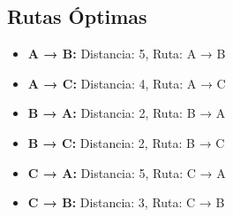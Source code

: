 \documentclass[12pt]{article}
\begin{document}
\clearpage
\subsection{Rutas Óptimas}
\begin{itemize}
\item \textbf{A → B:} Distancia: 5, Ruta: A → B
\item \textbf{A → C:} Distancia: 4, Ruta: A → C
\item \textbf{B → A:} Distancia: 2, Ruta: B → A
\item \textbf{B → C:} Distancia: 2, Ruta: B → C
\item \textbf{C → A:} Distancia: 5, Ruta: C → A
\item \textbf{C → B:} Distancia: 3, Ruta: C → B
\end{itemize}
\end{document}
